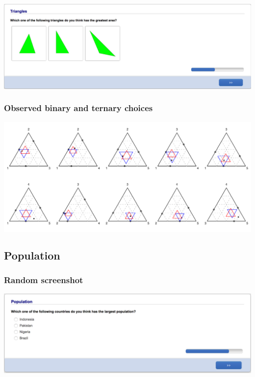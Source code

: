 \documentclass[11pt,letter]{article}
\begin{document}
\includegraphics[width=15cm]{Population_study_design/screenshot_Triangles.png}

\subsubsection*{Observed binary and ternary choices}

\includegraphics[width=15cm]{./Population_study_data/Simplexes/Triangles.pdf}

\pagebreak

\subsection{Population}



\subsubsection*{Random screenshot}

\includegraphics[width=15cm]{Population_study_design/screenshot_Population.png}
\end{document}

